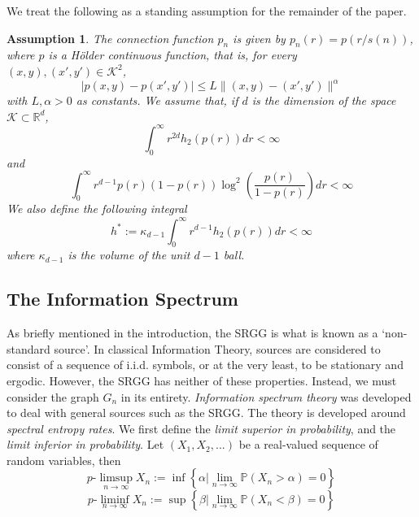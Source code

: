 \documentclass[conference,letterpaper]{IEEEtran}
\newtheorem{assumption}{Assumption}
\newcommand{\tti}{\rightarrow\infty}
\newcommand{\prob}[1]{\mathbb{P}\left(#1\right)}
\newcommand{\plimsup}[0]{p\mbox{-}\limsup}
\newcommand{\pliminf}[0]{p\mbox{-}\liminf}
\begin{document}
We treat the following as a standing assumption for the remainder of the paper.

\begin{assumption}
    \label{ass:1}
    The connection function $p_n$ is given by $p_n(r) = p(r/s(n))$, where $p$ is a H\"older continuous function, that is, for every $(x,y),(x',y') \in \mathcal{K}^2$,
    \begin{equation}
        |p(x,y) - p(x',y')| \leq L\|(x,y)-(x',y')\|^\alpha
    \end{equation}
    with $L, \alpha > 0$ as constants. We assume that, if $d$ is the dimension of the space $\mathcal{K} \subset \mathbb{R}^d$,
        \begin{equation}
            \label{ass:var_1}
            \int_0^\infty r^{2d}h_2(p(r)) dr < \infty
        \end{equation}
        and
        \begin{equation}
            \label{ass:var_2}
            \int_0^\infty r^{d-1}p(r)(1-p(r))\log^2\left(\frac{p(r)}{1-p(r)}\right)dr <\infty
        \end{equation}
    We also define the following integral
    \begin{equation}
        \label{ass:h_star}
        h^* := \kappa_{d-1}\int_0^\infty r^{d-1}h_2(p(r))dr < \infty
    \end{equation}
    where $\kappa_{d-1}$ is the volume of the unit $d-1$ ball. 
\end{assumption}

\subsection{The Information Spectrum}

As briefly mentioned in the introduction, the SRGG is what is known as a `non-standard source'. In classical Information Theory, sources are considered to consist of a sequence of i.i.d. symbols, or at the very least, to be stationary and ergodic. However, the SRGG has neither of these properties. Instead, we must consider the graph $G_n$ in its entirety. \textit{Information spectrum theory} was developed to deal with general sources such as the SRGG. The theory is developed around \textit{spectral entropy rates}. We first define the \textit{limit superior in probability}, and the \textit{limit inferior in probability}. Let $(X_1,X_2,...)$ be a real-valued sequence of random variables, then
\begin{equation}
    \plimsup_{n\tti} X_n := \inf \left\{\alpha | \lim_{n\tti}\prob{X_n > \alpha} =0\right\}
\end{equation}
\begin{equation}
    \pliminf_{n\tti} X_n := \sup \left\{\beta | \lim_{n\tti}\prob{X_n < \beta} =0\right\}
\end{equation}
\end{document}
